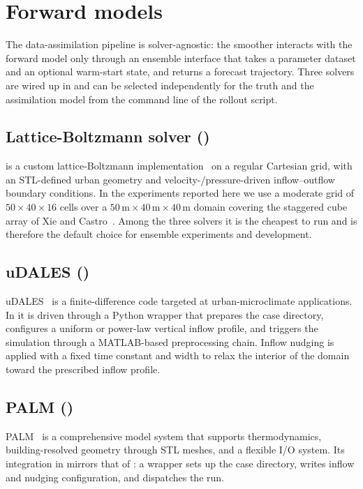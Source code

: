 \section{Forward models}
\label{sec:forward}

The data-assimilation pipeline is solver-agnostic: the smoother
interacts with the forward model only through an ensemble interface
that takes a parameter dataset and an optional warm-start state, and
returns a forecast trajectory.  Three solvers are wired up in
\pyurbanair{} and can be selected independently for the truth and
the assimilation model from the command line of the rollout script.

\subsection{Lattice-Boltzmann solver (\pylbm{})}
\pylbm{} is a custom lattice-Boltzmann
implementation~\cite{succi2001lbm} on a regular Cartesian grid, with
an STL-defined urban geometry and velocity-/pressure-driven
inflow--outflow boundary conditions.  In the experiments reported
here we use a moderate grid of $50 \times 40 \times 16$ cells over a
$50\,\mathrm{m}\times 40\,\mathrm{m}\times 40\,\mathrm{m}$ domain
covering the staggered cube array of Xie and
Castro~\cite{xie2008castro}.  Among the three solvers it is the
cheapest to run and is therefore the default choice for ensemble
experiments and development.

\subsection{uDALES (\pyudales{})}
uDALES~\cite{suter2018udales} is a finite-difference \LES{} code
targeted at urban-microclimate applications.  In \pyurbanair{} it is
driven through a Python wrapper that prepares the case directory,
configures a uniform or power-law vertical inflow profile, and
triggers the simulation through a MATLAB-based preprocessing chain.
Inflow nudging is applied with a fixed time constant and width to
relax the interior of the domain toward the prescribed inflow
profile.

\subsection{PALM (\pypalm{})}
PALM~\cite{maronga2020palm} is a comprehensive \LES{} model system
that supports thermodynamics, building-resolved geometry through STL
meshes, and a flexible I/O system.  Its integration in \pyurbanair{}
mirrors that of \pyudales{}: a wrapper sets up the case directory,
writes inflow and nudging configuration, and dispatches the run.

